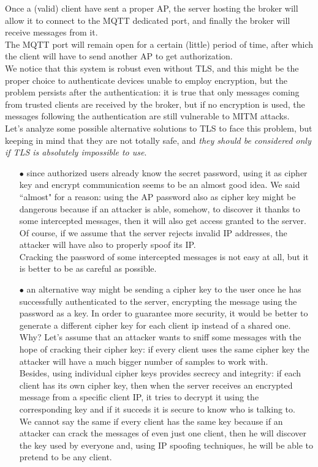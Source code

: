 \documentclass[12pt]{report}
\begin{document}
{{Once a (valid) client have sent a proper AP, the server hosting the broker will allow it to connect to the MQTT dedicated port, and finally the broker will receive messages from it.\\
The MQTT port will remain open for a certain (little) period of time, after which the client will have to send another AP to get authorization.\\

We notice that this system is robust even without TLS, and this might be the proper choice to authenticate devices unable to employ encryption, but the problem persists after the authentication: it is true that only messages coming from trusted clients are received by the broker, but if no encryption is used, the messages following the authentication are still vulnerable to MITM attacks.\\

Let's analyze some possible alternative solutions to TLS to face this problem, but keeping in mind that they are not totally safe, and \emph{they should be considered only if TLS is absolutely impossible to use}.

\begin{itemize}
\setlength{\itemindent}{+4mm}
\item[$\bullet$] since authorized users already know the secret password, using it as cipher key and encrypt communication seems to be an almost good idea. We said ``almost" for a reason: using the AP password also as cipher key might be dangerous because if an attacker is able, somehow, to discover it thanks to some intercepted messages, then it will also get access granted to the server.\\
Of course, if we assume that the server rejects invalid IP addresses, the attacker will have also to properly spoof its IP.\\
Cracking the password of some intercepted messages is not easy at all, but it is better to be as careful as possible.
\item[$\bullet$] an alternative way might be sending a cipher key to the user once he has successfully authenticated to the server, encrypting the message using the password as a key. In order to guarantee more security, it would be better to generate a different cipher key for each client ip instead of a shared one. Why?
Let's assume that an attacker wants to sniff some messages with the hope of cracking their cipher key: if every client uses the same cipher key the attacker will have a much bigger number of samples to work with.\\
Besides, using individual cipher keys provides secrecy and integrity: if each client has its own cipher key, then when the server receives an encrypted message from a specific client IP, it tries to decrypt it using the corresponding key and if it succeds it is secure to know who is talking to.\\
We cannot say the same if every client has the same key because if an attacker can crack the messages of even just one client, then he will discover the key used by everyone and, using IP spoofing techniques, he will be able to pretend to be any client.\\


\end{itemize}}}
\end{document}
